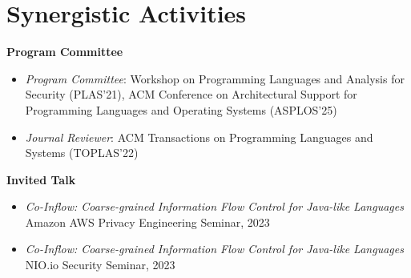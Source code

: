 \documentclass[12pt]{article}
\begin{document}
\section{Synergistic Activities}


\textbf{Program Committee} 
\begin{itemize}
\item \emph{Program Committee}: Workshop on Programming Languages and Analysis for Security (PLAS'21), ACM Conference on Architectural Support for Programming Languages and Operating Systems (ASPLOS'25)
\item \emph{Journal Reviewer}: ACM Transactions on Programming Languages and Systems (TOPLAS'22)
\end{itemize}



\textbf{Invited Talk}


\begin{itemize}
\item \emph{Co-Inflow: Coarse-grained Information Flow Control for Java-like Languages} \\
  Amazon AWS Privacy Engineering Seminar, 2023

\item   \emph{Co-Inflow: Coarse-grained Information Flow Control for Java-like Languages} \\
  NIO.io Security Seminar, 2023

\end{itemize}






\end{document}
